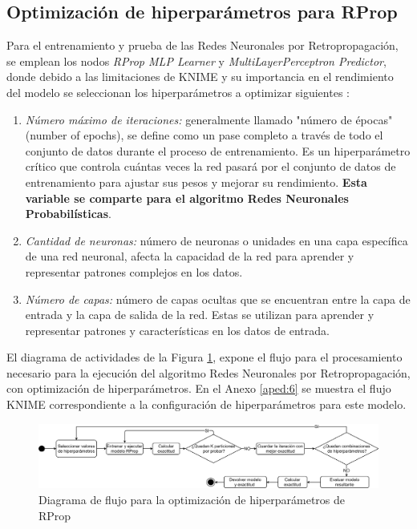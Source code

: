 \subsection{Optimización de hiperparámetros para RProp}
Para el entrenamiento y prueba de las Redes Neuronales por Retropropagación, se emplean los nodos \textit{RProp MLP Learner} y \textit{MultiLayerPerceptron Predictor}, donde debido a las limitaciones de KNIME y su importancia en el rendimiento del modelo se seleccionan los hiperparámetros a optimizar siguientes \citep{montavon2012neural}:
	\begin{enumerate}
		\item \textit{Número máximo de iteraciones:} generalmente llamado "número de épocas" (number of epochs), se define como un pase completo a través de todo el conjunto de datos durante el proceso de entrenamiento. Es un hiperparámetro crítico que controla cuántas veces la red pasará por el conjunto de datos de entrenamiento para ajustar sus pesos y mejorar su rendimiento. \textbf{Esta variable se comparte para el algoritmo Redes Neuronales Probabilísticas}.
		\item \textit{Cantidad de neuronas:} número de neuronas o unidades en una capa específica de una red neuronal, afecta la capacidad de la red para aprender y representar patrones complejos en los datos.
		\item \textit{Número de capas:} número de capas ocultas que se encuentran entre la capa de entrada y la capa de salida de la red. Estas se utilizan para aprender y representar patrones y características en los datos de entrada.
	\end{enumerate}

El diagrama de actividades de la Figura \ref{fig:optimizacion-rprop}, expone el flujo para el procesamiento necesario para la ejecución del algoritmo Redes Neuronales por Retropropagación, con optimización de hiperparámetros. En el Anexo \ref{aped:6} se muestra el flujo KNIME correspondiente a la configuración de hiperparámetros para este modelo.

\begin{figure}[H]
	\centering
	\includegraphics[width=1\linewidth]{"figuras/capi 2/hpo/Optimizacion RProp"}
	\caption{Diagrama de flujo para la optimización de hiperparámetros de RProp}
	\label{fig:optimizacion-rprop}
\end{figure}


